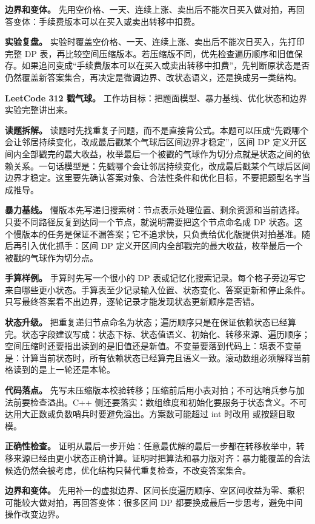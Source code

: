 \textbf{边界和变体。} 先用空价格、一天、连续上涨、卖出后不能次日买入做对拍，再回答变体：手续费版本可以在买入或卖出转移中扣费。

\textbf{实验复盘。} 实验时覆盖空价格、一天、连续上涨、卖出后不能次日买入，先打印完整 DP 表，再比较空间压缩版本。若压缩版不同，优先检查遍历顺序和旧值保存。如果追问变成“手续费版本可以在买入或卖出转移中扣费”，先判断原状态是否仍然覆盖新答案集合，再决定是微调边界、改状态语义，还是换成另一类结构。

\noindent\textbf{LeetCode 312 戳气球。} 工作坊目标：把题面模型、暴力基线、优化状态和边界实验完整讲出来。

\textbf{读题拆解。} 读题时先找重复子问题，而不是直接背公式。本题可以压成“先戳哪个会让邻居持续变化，改成最后戳某个气球后区间边界才稳定”，区间 DP 定义开区间内全部戳完的最大收益，枚举最后一个被戳的气球作为切分点就是状态之间的依赖关系。一句话模型是：先戳哪个会让邻居持续变化，改成最后戳某个气球后区间边界才稳定。这里要先确认答案对象、合法性条件和优化目标，不要把题型名字当成推导。

\textbf{暴力基线。} 慢版本先写递归搜索树：节点表示处理位置、剩余资源和当前选择。只要不同路径反复到达同一个节点，就说明需要把这个节点命名成 DP 状态。这个慢版本的任务是保证不漏答案；它不追求快，只负责给优化版提供对拍基准。随后再引入优化抓手：区间 DP 定义开区间内全部戳完的最大收益，枚举最后一个被戳的气球作为切分点。

\textbf{手算样例。} 手算时先写一个很小的 DP 表或记忆化搜索记录。每个格子旁边写它来自哪些更小状态。手算表至少记录输入位置、状态变化、答案更新和停止条件。只写最终答案看不出边界，逐轮记录才能发现状态更新顺序是否错。

\textbf{状态升级。} 把重复递归节点命名为状态；遍历顺序只是在保证依赖状态已经算完。状态字段建议写成：状态下标、状态值语义、初始化、转移来源、遍历顺序；空间压缩时还要指出读到的是旧值还是新值。不变量要落到代码上：填表不变量是：计算当前状态时，所有依赖状态已经算完且语义一致。滚动数组必须解释当前格读到的是上一轮还是本轮。

\textbf{代码落点。} 先写未压缩版本校验转移；压缩前后用小表对拍；不可达哨兵参与加法前要检查溢出。C++ 侧还要落实：数组维度和初始化要服务于状态含义。不可达用大正数或负数哨兵时要避免溢出。方案数可能超过 int 时改用  或按题目取模。

\textbf{正确性检查。} 证明从最后一步开始：任意最优解的最后一步都在转移枚举中，转移来源已经由更小状态正确计算。证明时把算法和暴力版对齐：暴力能覆盖的合法候选仍然会被考虑，优化结构只替代重复检查，不改变答案集合。

\textbf{边界和变体。} 先用补一的虚拟边界、区间长度遍历顺序、空区间收益为零、乘积可能较大做对拍，再回答变体：很多区间 DP 都要换成最后一步思考，避免中间操作改变边界。

